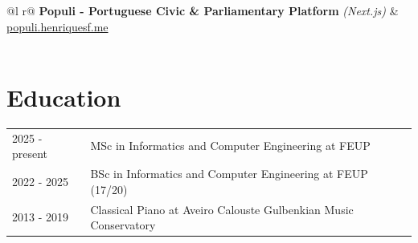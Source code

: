 \documentclass[a4paper,11pt]{article}
\begin{document}
\begin{tabularx}{\linewidth}{ @{}l r@{} }
  \textbf{Populi - Portuguese Civic \& Parliamentary Platform} \textit{(Next.js)} & \hfill \href{https://populi.henriquesf.me}{populi.henriquesf.me} \\[3.75pt]
  \\
\end{tabularx}

\section{Education}
\begin{tabularx}{\linewidth}{@{}l X@{}}
2025 - present & MSc in Informatics and Computer Engineering at FEUP \hfill \\

2022 - 2025 & BSc in Informatics and Computer Engineering at FEUP \hfill (17/20) \\

2013 - 2019 & Classical Piano at Aveiro Calouste Gulbenkian Music Conservatory \hfill \\

\end{tabularx}





\end{document}
